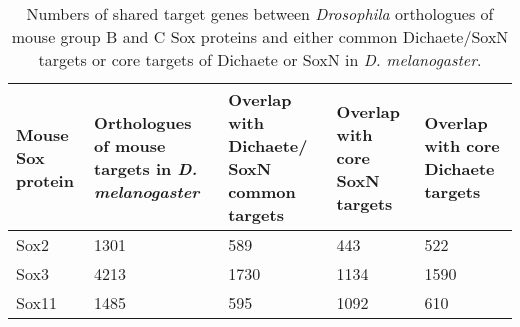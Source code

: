 \begin{table}[h]
\centering
\begin{tabular}{|p{2.3cm}|p{2.7cm}|p{3.0cm}|p{2.4cm}|p{2.4cm}|}
\hline
\textbf{Mouse Sox protein} & \textbf{Orthologues of mouse targets in \emph{D. melanogaster}} & \textbf{Overlap with Dichaete/ SoxN common targets} & \textbf{Overlap with core SoxN targets} & \textbf{Overlap with core Dichaete targets} \\ \hline
Sox2              & 1301                                            & 589                                       & 443                            & 522                                \\ \hline
Sox3              & 4213                                            & 1730                                      & 1134                           & 1590                               \\ \hline
Sox11             & 1485                                            & 595                                       & 1092                           & 610                                \\ \hline
\end{tabular}
\caption{Numbers of shared target genes between \emph{Drosophila} orthologues of mouse group B and C Sox proteins and either common Dichaete/SoxN targets or core targets of Dichaete or SoxN in \emph{D. melanogaster}.}
\label{Table 5.2}
\end{table}

